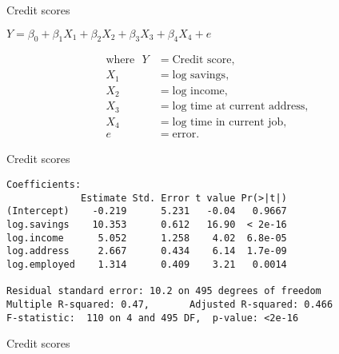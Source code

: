 \documentclass[14pt]{beamer}
\begin{document}
\begin{frame}{Credit scores}

\begin{block}{}
\centerline{$ Y = \beta_0 + \beta_1X_1 + \beta_2X_2 + \beta_3X_3 + \beta_4X_4 + e$}
\end{block}
\begin{align*}
\text{where~~}
Y     &=  \text{Credit score},         \\
X_{1} &=  \text{log savings}, \\
X_{2} &=  \text{log income},      \\
X_{3} &=  \text{log time at current address},\\
X_4     &=  \text{log time in current job},\\
e     &=  \text{error}.
\end{align*}



\end{frame}


\begin{frame}[fragile]{Credit scores}\footnotesize


\begin{verbatim}
Coefficients:
             Estimate Std. Error t value Pr(>|t|)
(Intercept)    -0.219      5.231   -0.04   0.9667
log.savings    10.353      0.612   16.90  < 2e-16
log.income      5.052      1.258    4.02  6.8e-05
log.address     2.667      0.434    6.14  1.7e-09
log.employed    1.314      0.409    3.21   0.0014

Residual standard error: 10.2 on 495 degrees of freedom
Multiple R-squared: 0.47,       Adjusted R-squared: 0.466
F-statistic:  110 on 4 and 495 DF,  p-value: <2e-16
\end{verbatim}
\end{frame}

\begin{frame}{Credit scores}
\end{frame}
\end{document}
